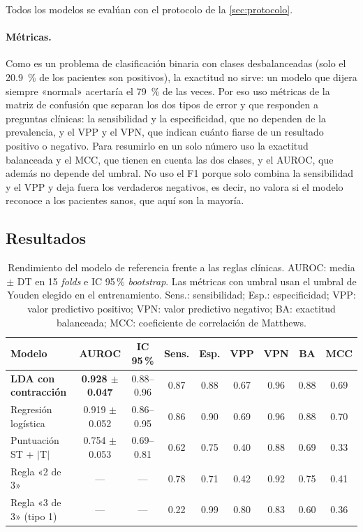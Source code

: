 Todos los modelos se evalúan con el protocolo de la \cref{sec:protocolo}.

\paragraph{Métricas.} Como es un problema de clasificación binaria con clases desbalanceadas (solo el \SI{20.9}{\percent} de los pacientes son positivos), la exactitud no sirve: un modelo que dijera siempre «normal» acertaría el \SI{79}{\percent} de las veces. Por eso uso métricas de la matriz de confusión que separan los dos tipos de error y que responden a preguntas clínicas: la sensibilidad y la especificidad, que no dependen de la prevalencia, y el VPP y el VPN, que indican cuánto fiarse de un resultado positivo o negativo. Para resumirlo en un solo número uso la exactitud balanceada y el MCC, que tienen en cuenta las dos clases, y el AUROC, que además no depende del umbral. No uso el F1 porque solo combina la sensibilidad y el VPP y deja fuera los verdaderos negativos, es decir, no valora si el modelo reconoce a los pacientes sanos, que aquí son la mayoría.

\subsection{Resultados}

\begin{table}[H]
\centering
\caption[Rendimiento del modelo de referencia]{Rendimiento del modelo de referencia frente a las reglas clínicas. AUROC: media $\pm$ DT en 15 \emph{folds} e IC 95\,\% \emph{bootstrap}. Las métricas con umbral usan el umbral de Youden elegido en el entrenamiento. Sens.: sensibilidad; Esp.: especificidad; VPP: valor predictivo positivo; VPN: valor predictivo negativo; BA: exactitud balanceada; MCC: coeficiente de correlación de Matthews.}
\label{tab:modelo}
\small
\setlength{\tabcolsep}{4.2pt}
\begin{tabular}{@{}lccS[table-format=1.2]S[table-format=1.2]S[table-format=1.2]S[table-format=1.2]S[table-format=1.2]S[table-format=1.2]@{}}
\toprule
\textbf{Modelo} & \textbf{AUROC} & \textbf{IC 95\,\%} & {\textbf{Sens.}} & {\textbf{Esp.}} & {\textbf{VPP}} & {\textbf{VPN}} & {\textbf{BA}} & {\textbf{MCC}} \\
\midrule
\textbf{LDA con contracción} & \textbf{\num{0.928} $\pm$ \num{0.047}} & \numrange{0.88}{0.96} & 0.87 & 0.88 & 0.67 & 0.96 & 0.88 & 0.69 \\
Regresión logística & \num{0.919} $\pm$ \num{0.052} & \numrange{0.86}{0.95} & 0.86 & 0.90 & 0.69 & 0.96 & 0.88 & 0.70 \\
\midrule
Puntuación ST + $|$T$|$ & \num{0.754} $\pm$ \num{0.053} & \numrange{0.69}{0.81} & 0.62 & 0.75 & 0.40 & 0.88 & 0.69 & 0.33 \\
Regla «2 de 3» & {---} & {---} & 0.78 & 0.71 & 0.42 & 0.92 & 0.75 & 0.41 \\
Regla «3 de 3» (tipo 1) & {---} & {---} & 0.22 & 0.99 & 0.80 & 0.83 & 0.60 & 0.36 \\
\bottomrule
\end{tabular}
\end{table}

